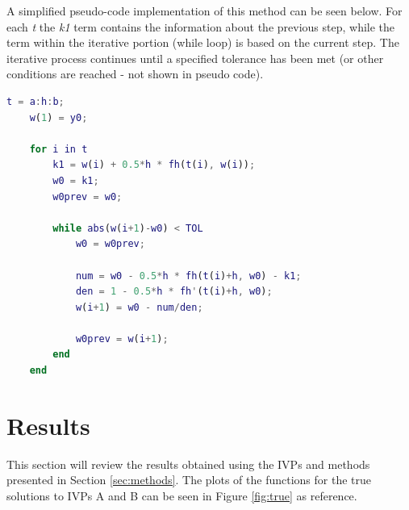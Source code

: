 \documentclass{article}
\begin{document}
A simplified pseudo-code implementation of this method can be seen below. For each \textit{t} the \textit{k1} term contains the information about the previous step, while the term within the iterative portion (while loop) is based on the current step. The iterative process continues until a specified tolerance has been met (or other conditions are reached - not shown in pseudo code).

\bigskip
\begin{center}
\footnotesize
\begin{lstlisting}[language=Matlab]
    t = a:h:b;
    w(1) = y0;

    for i in t
        k1 = w(i) + 0.5*h * fh(t(i), w(i));
        w0 = k1;
        w0prev = w0;

        while abs(w(i+1)-w0) < TOL
            w0 = w0prev;

            num = w0 - 0.5*h * fh(t(i)+h, w0) - k1;
            den = 1 - 0.5*h * fh'(t(i)+h, w0);
            w(i+1) = w0 - num/den;

            w0prev = w(i+1);
        end    
    end
\end{lstlisting}
\end{center}
\bigskip




\newpage
\section{Results}
\label{sec:results}

This section will review the results obtained using the IVPs and methods presented in Section \ref{sec:methods}. The plots of the functions for the true solutions to IVPs A and B can be seen in Figure \ref{fig:true} as reference.
\end{document}
